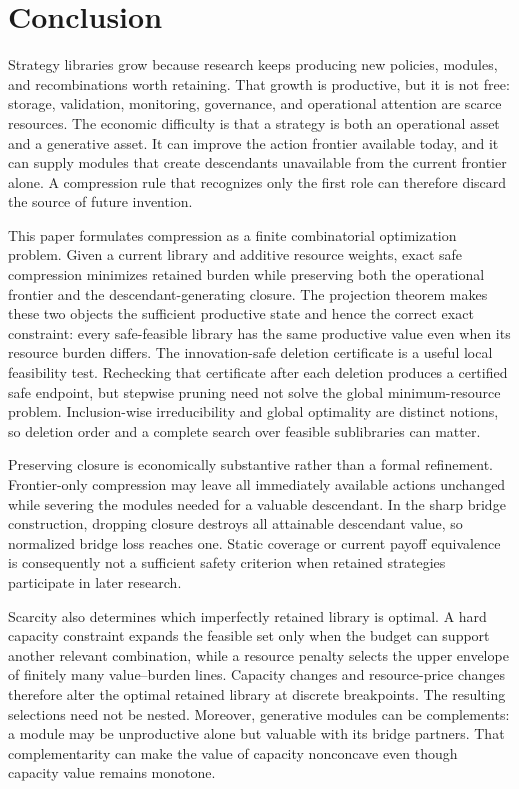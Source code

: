 \clearpage
\section{Conclusion}\label{sec:conclusion}

Strategy libraries grow because research keeps producing new policies,
modules, and recombinations worth retaining. That growth is productive, but
it is not free: storage, validation, monitoring, governance, and operational
attention are scarce resources. The economic difficulty is that a
strategy is both an operational asset and a generative asset. It can improve
the action frontier available today, and it can supply modules that create
descendants unavailable from the current frontier alone. A compression rule
that recognizes only the first role can therefore discard the source of
future invention.

This paper formulates compression as a finite combinatorial optimization
problem. Given a current library and additive resource weights, exact safe
compression minimizes retained burden while preserving both the operational
frontier and the descendant-generating closure. The projection theorem makes
these two objects the sufficient productive state and hence the correct exact
constraint: every safe-feasible library has the same productive value even
when its resource burden differs. The innovation-safe deletion certificate is
a useful local feasibility test. Rechecking that certificate after each
deletion produces a certified safe endpoint, but stepwise pruning need not
solve the global minimum-resource problem. Inclusion-wise irreducibility and
global optimality are distinct notions, so deletion order and a complete
search over feasible sublibraries can matter.

Preserving closure is economically substantive rather than a formal
refinement. Frontier-only compression may leave all immediately available
actions unchanged while severing the modules needed for a valuable
descendant. In the sharp bridge construction, dropping closure destroys all
attainable descendant value, so normalized bridge loss reaches one. Static
coverage or current payoff equivalence is consequently not a sufficient
safety criterion when retained strategies participate in later research.

Scarcity also determines which imperfectly retained library is optimal. A
hard capacity constraint expands the feasible set only when the budget can
support another relevant combination, while a resource penalty selects the
upper envelope of finitely many value--burden lines. Capacity changes and
resource-price changes therefore alter the optimal retained library at
discrete breakpoints. The resulting selections need not be nested. Moreover,
generative modules can be complements: a module may be unproductive alone
but valuable with its bridge partners. That complementarity can make the
value of capacity nonconcave even though capacity value remains monotone.

